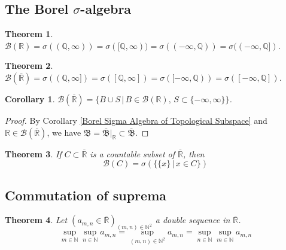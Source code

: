 \documentclass[11pt, a4paper, openany]{book}
\newtheorem{thm}{Theorem}\newtheorem{lem}{Lemma}\newtheorem{crl}{Corollary}
\theoremstyle{definition}
\newcommand{\er}{\overline{\mathbb{R}}}
\begin{document}
\subsection{The Borel \texorpdfstring{$\sigma$}{sigma}-algebra}
    \begin{thm}\label{Borel sigma algebra on R}
        $\mathscr{B}(\mathbb{R})=\sigma((\mathbb{Q},\infty))=\sigma([\mathbb{Q},\infty))=\sigma((-\infty,\mathbb{Q}))=\sigma((-\infty,\mathbb{Q}])$.
    \end{thm}
    \begin{thm}\label{Borel sigma algebra on ER}
        $\mathscr{B}(\overline{\mathbb{R}})=\sigma((\mathbb{Q},\infty])=\sigma([\mathbb{Q},\infty])=\sigma([-\infty,\mathbb{Q}))=\sigma([-\infty,\mathbb{Q}])$.
    \end{thm}
    \begin{crl}
        $\mathscr{B}(\overline{\mathbb{R}})=\{B\cup S\,|\,B\in\mathscr{B}(\mathbb{R}),\,S\subset \{-\infty,\infty\}\}$.
    \end{crl}
    \begin{proof}
        By Corollary \ref{Borel Sigma Algebra of Topological Subspace} and $\mathbb{R}\in \mathscr{B}(\overline{\mathbb{R}})$, we have $\mathfrak{B}={\overline{\mathfrak{B}}}|_{\mathbb{R}}\subset \overline{\mathfrak{B}}$.
    \end{proof}
    \begin{thm}\label{Borel sigma algebra of a countable subset}
        If $C\subset\er$ is a countable subset of $\er$, then
        \[
            \mathscr{B}(C)=\sigma(\{\{x\}\,|\,x\in C\})
        \]
    \end{thm}
\subsection{Commutation of suprema}
    \begin{thm}\label{commutation of suprema}
        Let $(a_{m,n}\in \er)_{(m,n)\in\mathbb{N}^2}$ a double sequence in $\er$.
        \[
            \sup_{m\in\mathbb{N}}\sup_{n\in\mathbb{N}}a_{m,n}=\sup_{(m,n)\in\mathbb{N}^2}a_{m,n}=\sup_{n\in\mathbb{N}}\sup_{m\in\mathbb{N}}a_{m,n}
        \]
    \end{thm}
\end{document}
